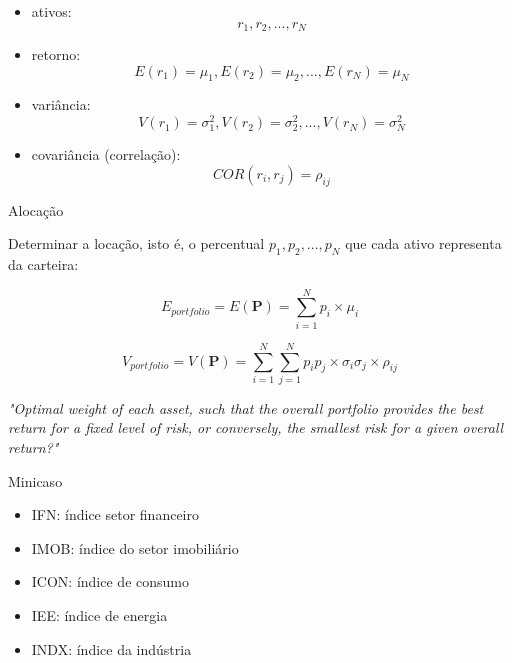 \documentclass{beamer}
\begin{document}
\begin{frame}{\cite{mkv}}

\begin{itemize}
\item ativos: $$r_1,r_2,...,r_N$$
\item retorno: $$E(r_1)=\mu_1,E(r_2)=\mu_2,...,E(r_N)=\mu_N$$
\item variância: $$V(r_1)=\sigma^2_1,V(r_2)=\sigma^2_2,...,V(r_N)=\sigma^2_N$$
\item covariância (correlação): $$COR(r_i,r_j) = \rho_{ij}$$
\end{itemize}


\end{frame}

\begin{frame}{Alocação}

Determinar a locação, isto é, o percentual $p_1,p_2,...,p_N$ que cada ativo representa da carteira:

  
\begin{equation}
E_{portfolio} = E(\mathbf{ P})=  \sum_{i=1}^N p_i \times \mu_i
\end{equation}


\begin{equation}
V_{portfolio} =V(\mathbf{ P})= \sum_{i=1}^N\sum_{j=1}^N p_i p_j \times \sigma_i \sigma_j \times  \rho_{ij}
\end{equation}



\textit{"Optimal weight of each asset, such that the overall portfolio provides the best return for a fixed level of risk, or conversely, the smallest risk for a given overall
return?"} \cite{Laloux1999}


\end{frame}



\begin{frame}{Minicaso}

\begin{itemize}
  \item IFN:  índice setor financeiro
  \item IMOB: índice do setor imobiliário
  \item ICON: índice de consumo
  \item IEE:  índice de energia
  \item INDX: índice da indústria
\end{itemize}

\end{frame}
\end{document}
